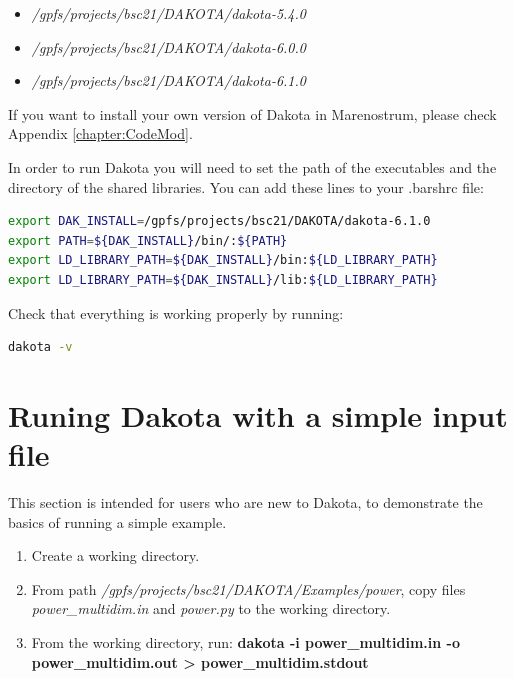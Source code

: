 \documentclass[12pt,a4paper,article]{memoir}
\begin{document}
\begin{itemize}
\item \textit{/gpfs/projects/bsc21/DAKOTA/dakota-5.4.0}
\item \textit{/gpfs/projects/bsc21/DAKOTA/dakota-6.0.0}
\item \textit{/gpfs/projects/bsc21/DAKOTA/dakota-6.1.0}
\end{itemize}

If you want to install your own version of Dakota in Marenostrum, please check Appendix \ref{chapter:CodeMod}.


In order to run Dakota you will need to set the path of the executables and the directory of the shared libraries. You can add these lines to your .barshrc file:

\begin{lstlisting}[style=MyCodeStyle,language=bash]
export DAK_INSTALL=/gpfs/projects/bsc21/DAKOTA/dakota-6.1.0
export PATH=${DAK_INSTALL}/bin/:${PATH}
export LD_LIBRARY_PATH=${DAK_INSTALL}/bin:${LD_LIBRARY_PATH}
export LD_LIBRARY_PATH=${DAK_INSTALL}/lib:${LD_LIBRARY_PATH}
\end{lstlisting}

Check that everything is working properly by running:

\begin{lstlisting}[style=MyCodeStyle,language=bash]
dakota -v
\end{lstlisting}

\section{Runing Dakota with a simple input file}
\label{section:RunDakota}

This section is intended for users who are new to Dakota, to demonstrate the basics of running a simple example.

\begin{enumerate}
\item Create a working directory.
\item From path \textit{/gpfs/projects/bsc21/DAKOTA/Examples/power}, copy files \textit{power\_multidim.in} and \textit{power.py} to the working directory.
\item From the working directory, run: \textbf{dakota -i power\_multidim.in -o power\_multidim.out \textgreater{} power\_multidim.stdout}
\end{enumerate}
\end{document}
